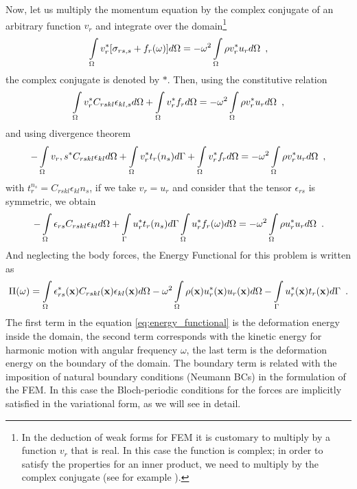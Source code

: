 Now, let us multiply the momentum equation by the complex conjugate of an arbitrary function $v_r$ and integrate over the domain\footnote{In the deduction of weak forms for FEM it is customary to multiply by a function $v_r$ that is real. In this case the function is complex; in order to satisfy the properties for an inner product, we need to multiply by the complex conjugate (see for example  \cite{sukumar_bloch-2009, book:arfken}).}
\[\int\limits_{\Omega} v_r^{*}[\sigma_{rs,s} + f_r(\omega)]d \Omega = -\omega^2 \int\limits_{\Omega} \rho v_r^{*} u_r d \Omega \enspace , \]
the complex conjugate is denoted by $*$. Then, using the constitutive relation
\[\int\limits_{\Omega} v_r^{*}C_{rskl}\epsilon_{kl,s}d \Omega + \int\limits_{\Omega} v_r^{*}f_r d \Omega = -\omega^2 \int\limits_{\Omega} \rho v_r^{*} u_r d \Omega \enspace , \]
and using divergence theorem
\[-\int\limits_{\Omega} v_r,s^{*}C_{rskl}\epsilon_{kl}d \Omega + \int\limits_{\Omega}v_r^{*}t_r(n_s)d \Gamma +  \int\limits_{\Omega} v_r^{*}f_r d \Omega = -\omega^2 \int\limits_{\Omega} \rho v_r^{*} u_r d \Omega \enspace , \]
with $t_r^{n_s} = C_{rskl}\epsilon_{kl}n_{s}$, if we take $v_r = u_r$ and consider that the tensor $\epsilon_{rs}$ is symmetric, we obtain
\[ -\int\limits_{\Omega} \epsilon_{rs}C_{rskl}\epsilon_{kl} d \Omega + \int\limits_\Gamma u_r^{*} t_{r}(n_s) d \Gamma \int\limits_\Omega u_r^{*}f_r(\omega) d\Omega = -\omega^2\int\limits_\Omega \rho u_r^{*} u_r d\Omega \enspace . \]
And neglecting the body forces, the Energy Functional for this problem is written as
\begin{equation}
\Pi(\omega) = \int\limits_\Omega \epsilon_{rs}^{*}(\mathbf{x})C_{rskl}(\mathbf{x})\epsilon_{kl}(\mathbf{x}) d \Omega - \omega^2\int\limits_\Omega \rho(\mathbf{x})u_r^{*}(\mathbf{x})u_r(\mathbf{x}) d\Omega - \int\limits_{\Gamma} u_r^{*}(\mathbf{x})t_r(\mathbf{x}) d\Gamma \enspace .
\label{eq:energy_functional}
\end{equation}
The first term in the equation \eqref{eq:energy_functional} is the deformation energy inside the domain, the second term corresponds with the kinetic energy for harmonic motion with angular frequency $\omega$, the last term is the deformation energy on the boundary of the domain. The boundary term is related with the imposition of natural boundary conditions (Neumann BCs) in the formulation of the FEM. In this case the Bloch-periodic conditions for the forces are implicitly satisfied  in the variational form, as we will see in detail.


